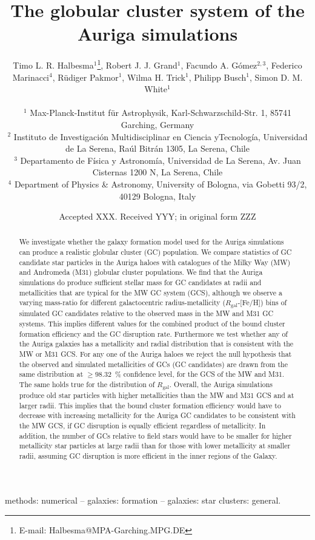 \documentclass[a4paper,fleqn,usenatbib]{mnras}
\title[Auriga GCS]{The globular cluster system of the Auriga simulations}
\author[T. L. R. Halbesma et al.]{\parbox[t]{\textwidth}{
    Timo L. R. Halbesma$^{1}$\thanks{E-mail: Halbesma@MPA-Garching.MPG.DE},
    Robert J. J. Grand$^{1}$,
    Facundo A. G\'{o}mez$^{2,3}$,
    Federico Marinacci$^{4}$,
    R\"{u}diger Pakmor$^{1}$,
    Wilma H. Trick$^{1}$,
    Philipp Busch$^{1}$,
    Simon D. M. White$^{1}$
} \vspace{10pt} \\
$^{1}$ Max-Planck-Institut f\"ur Astrophysik, Karl-Schwarzschild-Str. 1,
    85741 Garching, Germany \\
$^{2}$ Instituto de Investigaci\'{o}n Multidisciplinar en Ciencia yTecnolog\'{i}a,
    Universidad de La Serena, Ra\'{u}l Bitr\'{a}n 1305, La Serena, Chile \\
$^{3}$ Departamento de F\'{i}sica y Astronom\'{i}a, Universidad de La Serena, Av.
    Juan Cisternas 1200 N, La Serena, Chile \\
$^{4}$ Department of Physics \& Astronomy, University of Bologna, via Gobetti 93/2, 40129 Bologna, Italy \\
}
\date{Accepted XXX. Received YYY; in original form ZZZ}
\begin{document}
\label{firstpage}
\pagerange{\pageref{firstpage}--\pageref{lastpage}}
\maketitle

\begin{abstract}
We investigate whether the galaxy formation model used for the Auriga simulations
can produce a realistic globular cluster (GC) population. We compare statistics 
of GC candidate star particles in the Auriga haloes with catalogues of the Milky 
Way (MW) and Andromeda (M31) globular cluster populations. We find that the Auriga 
simulations do produce sufficient stellar mass for GC candidates at radii and 
metallicities that are typical for the MW GC system (GCS), although we observe a 
varying mass-ratio for different galactocentric radius-metallicity 
($R_{\text{gal}}$-[Fe/H]) bins of simulated GC candidates relative to the 
observed mass in the MW and M31 GC systems.
This implies different values for the combined product of the bound cluster 
formation efficiency and the GC disruption rate. Furthermore we test whether any of the 
Auriga galaxies has a metallicity and radial distribution that is consistent with 
the MW or M31 GCS. For any one of the Auriga haloes we reject the null hypothesis
that the observed and simulated metallicities of GCs (GC candidates) are drawn
from the same distribution at $\geq98.32$~\% confidence level, for the GCS of 
the MW and M31. The same holds true for the distribution of $R_{\text{gal}}$.
Overall, the Auriga simulations produce old star particles with higher metallicities 
than the MW and M31 GCS and at larger radii. This implies that the bound cluster
formation efficiency would have to decrease with increasing metallicity for the 
Auriga GC candidates to be consistent with the MW GCS, if GC disruption is equally 
efficient regardless of metallicity. In addition, the number of GCs relative to
field stars would have to be smaller for higher metallicity star particles at
large radii than for those with lower metallicity at smaller radii, assuming GC 
disruption is more efficient in the inner regions of the Galaxy.
\end{abstract}

\begin{keywords}
methods: numerical -- galaxies: formation -- galaxies: star clusters: general.
\end{keywords}
\end{document}
